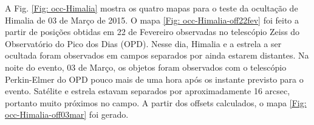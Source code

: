 \documentclass[12pt,a4paper]{monografia}
\begin{document}
A Fig. \ref{Fig: occ-Himalia} mostra os quatro mapas para o teste da ocultação de Himalia de 03 de Março de 2015. O mapa \ref{Fig: occ-Himalia-off22fev} foi feito a partir de posições obtidas em 22 de Fevereiro observadas no telescópio Zeiss do Observatório do Pico dos Dias (OPD). Nesse dia, Himalia e a estrela a ser ocultada foram observados em campos separados por ainda estarem distantes. Na noite do evento, 03 de Março, os objetos foram observados com o telescópio Perkin-Elmer do OPD pouco mais de uma hora após os instante previsto para o evento. Satélite e estrela estavam separados por aproximadamente 16 arcsec, portanto muito próximos no campo. A partir dos offsets calculados, o mapa \ref{Fig: occ-Himalia-off03mar} foi gerado.

\begin{figure}[h!]
\begin{centering}

\end{centering}
\end{figure}
\end{document}
